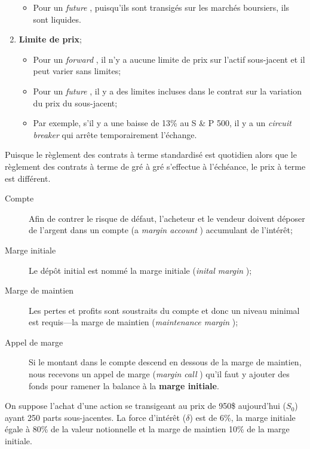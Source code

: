 \documentclass[10pt, french]{article}
\begin{document}
\begin{multicols*}{2}
\begin{definitionNOHFILL}
\begin{enumerate}[leftmargin = *]
\begin{itemize}[leftmargin = *]
		\item	Pour un \og \textit{future} \fg{}, puisqu'ils sont transigés sur les marchés boursiers, ils sont liquides.
		\end{itemize}
	\item	\textbf{Limite de prix};
		\begin{itemize}[leftmargin = *]
		\item	Pour un \og \textit{forward} \fg{}, il n'y a aucune limite de prix sur l'actif sous-jacent et il peut varier sans limites;
		\item	Pour un \og \textit{future} \fg{}, il y a des limites incluses dans le contrat sur la variation du prix du sous-jacent;
		\item	Par exemple, s'il y a une baisse de 13\% au S \& P 500, il y a un \og \textit{circuit breaker} \fg{} qui arrête temporairement l'échange.
		\end{itemize}
\end{enumerate}

Puisque le règlement des contrats à terme standardisé est quotidien alors que le règlement des contrats à terme de gré à gré s'effectue à l'échéance, le prix à terme est différent.
\end{definitionNOHFILL}

\begin{definitionNOHFILL}
\begin{description}
	\item[Compte]	Afin de contrer le risque de défaut, l'acheteur et le vendeur doivent déposer de l'argent dans un compte (\og a \textit{margin account} \fg{}) accumulant de l'intérêt;
	\item[Marge initiale]	Le dépôt initial est nommé la marge initiale (\og \textit{inital margin} \fg{});
	\item[Marge de maintien]Les pertes et profits sont soustraits du compte et donc un niveau minimal est requis---la marge de maintien (\og \textit{maintenance margin} \fg{});
	\item[Appel de marge]	Si le montant dans le compte descend en dessous de la marge de maintien, nous recevons un appel de marge (\og \textit{margin call} \fg{}) qu'il faut y ajouter des fonds pour ramener la balance à la \textbf{marge initiale}.
\end{description}
\end{definitionNOHFILL}

\begin{algo2}[Exemple]
On suppose l'achat d'une action se transigeant au prix de 950\$ aujourd'hui ($S_{0}$) ayant 250 parts sous-jacentes. La force d'intérêt ($\delta$) est de 6\%, la marge initiale égale à 80\% de la valeur notionnelle et la marge de maintien 10\% de la marge initiale.


\end{algo2}
\end{multicols*}
\end{document}
